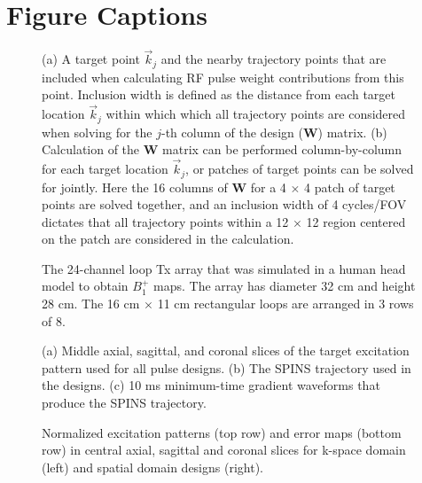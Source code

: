 \documentclass[11pt]{article}
\renewcommand{\textcolor}[1]{}
\begin{document}
\pagebreak

\section*{Figure Captions}

\begin{figure}[!h]
	\centering
	\caption{(a) A target point $\vec{k}_j$ and the nearby trajectory points that are included when calculating 
	RF pulse weight contributions from this point.
	Inclusion width is defined as the distance from each target location $\vec{k}_j$ within which 
	which all trajectory points are considered when solving for the $j$-th column of the design ($\bm{W}$) matrix.
	(b) Calculation of the $\bm{W}$ matrix can be performed column-by-column for each target location $\vec{k}_j$,
	or patches of target points can be solved for jointly. 
	Here the 16 columns of $\bm{W}$ for a 4 $\times$ 4 patch of target points are solved together,
	and an inclusion width of 4 cycles/FOV dictates that all trajectory points within a 12 $\times$ 12 region
	centered on the patch are considered in the calculation.}
	\label{fig:Patch}
\end{figure}

\begin{figure}[!h]
	\centering
	\caption{The 24-channel loop Tx array that was simulated in a human head model to obtain $B_1^+$ maps. 
	The array has diameter 32 cm and height 28 cm. The 16 cm $\times$ 11 cm rectangular loops are arranged in 3 rows of 8.}
	\label{fig:Coil}
\end{figure}

\begin{figure}[!h]
	\centering
	\caption{(a) Middle axial, sagittal, and coronal slices of the target excitation pattern used for all pulse designs. 
	(b) The SPINS trajectory used in the designs. 
	(c) 10 ms minimum-time gradient waveforms that produce the SPINS trajectory.}
	\label{fig:Target}
\end{figure}

\begin{figure}[!h]
	\centering
	\caption{ %
	Normalized excitation patterns (top row) and error maps (bottom row) in central axial, sagittal and coronal slices 
	for k-space domain (left) and spatial domain designs (right).}
	\label{fig:ErrorMap}
\end{figure}
\end{document}
